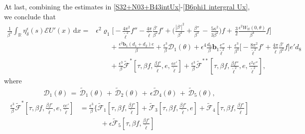 \documentclass[10pt, reqno]{amsart}
\numberwithin{equation}{section}
\theoremstyle{definition}
\begin{document}
{\medskip
At last, combining the estimates in \eqref{S32+N03+B43intUx}-\eqref{B6phi1 intergral Ux},
we conclude that
\begin{align*}
\frac{1}{\beta^3}\int_{\mathbb R}\eta_\delta^\epsilon(s){\mathcal E}U'(x) \,{\mathrm d}x
= &
 \epsilon^2\varrho_1\Bigg[- \frac{4\pi^2}{{\tilde\ell}^2}{f}'' - \frac{4\pi}{\tilde\ell} \frac{\beta'}{\beta^2} f'
+ \Big(\frac{|\beta'|^2}{\beta^4}
+\frac{\beta''} {\beta^3}
\,-\,\frac{5\kappa^2}{3\beta^2} \Big) f
+ \, \frac 32\frac{\epsilon^2W_{tt}(0, \theta)}{\beta^4} f \Bigg]
\nonumber\\[2mm]
&\qquad + \frac {\epsilon^2 {\mathbf b}_1(d_1+d_2)e}\beta
+\frac{\epsilon^3}{\beta}{\mathcal D}_1(\theta)
+ \epsilon^4 \frac{d_6} {\beta}{\mathbf b}_1 \frac{e''}{\tilde\ell^2}
+ \frac{\epsilon^3}{\beta^3}\Big[ -\frac{8\pi^2}{{\tilde\ell}^2}f' +\frac{4\pi}{ {\tilde\ell}}\frac{\beta'}{\beta^2} f\Big]e'd_8
\nonumber\\[2mm]
&\qquad
+\frac{\epsilon^3}{\beta}\tilde{\mathcal F}^{*} \left[\tau, \beta f, \frac{\beta {f}'}{\tilde\ell}, e, \frac{\epsilon e'}{\tilde\ell}\right]
+ \frac{\epsilon^3}{\beta}\tilde{\mathcal F}^{**} \left[\tau, \beta f, \frac{\beta f''}{\tilde\ell^2} , e, \frac{\epsilon^2 e''}{\tilde\ell^2}\right],
\end{align*}
where
\begin{align*}
{\mathcal D}_1(\theta)\,=\,\tilde{\mathcal D}_1(\theta)\,+\,\tilde{\mathcal D}_2(\theta)\,+\,\epsilon \tilde{\mathcal D}_4 (\theta)
\,+\,\tilde{\mathcal D}_5(\theta),
\end{align*}
\begin{align*}
\frac{\epsilon^3}{\beta}\tilde{\mathcal F}^* \left[\tau, \beta f, \frac{\beta {f}'}{\tilde\ell}, e, \frac{\epsilon e'}{\tilde\ell}\right]
&= \frac{\epsilon^3}{\beta}
\Bigg\{\tilde{\mathcal F}_1\left[\tau, \beta f, \frac{\beta {f}'}{\tilde\ell}\right]
+\tilde{\mathcal F}_{3}\left[\tau, \beta f, \frac{\beta {f}'}{\tilde\ell}, e\right]
+\tilde{\mathcal F}_{4}\left[\tau, \beta f, \frac{\beta {f}'}{\tilde\ell} \right]
 \nonumber\\[2mm]
&\qquad \quad
+ \epsilon\tilde{\mathcal F}_{5}\left[\tau, \beta f, \frac{\beta {f}'}{\tilde\ell}\right]

\end{align*}}
\end{document}
